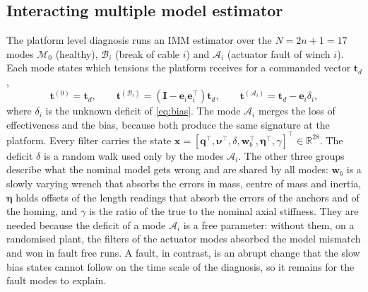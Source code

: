 \documentclass[a4paper,fleqn]{cas-dc}
\newcommand{\vc}[1]{\bm{#1}}
\newcommand{\mt}[1]{\mathbf{#1}}
\newcommand{\eye}{\mt{I}}
\begin{document}
\subsection{Interacting multiple model estimator}\label{sec:imm}

The platform level diagnosis runs an IMM estimator \citep{blom1988imm} over the $N=2n+1=17$ modes $\mathcal M_0$ (healthy), $\mathcal B_i$ (break of cable $i$) and $\mathcal A_i$ (actuator fault of winch $i$). Each mode states which tensions the platform receives for a commanded vector $\vc t_d$,
\begin{equation}\label{eq:modes}
\vc t^{(0)}=\vc t_d,\qquad \vc t^{(\mathcal B_i)}=(\eye-\vc e_i\vc e_i^\top)\vc t_d,\qquad \vc t^{(\mathcal A_i)}=\vc t_d-\vc e_i\delta_i,
\end{equation}
where $\delta_i$ is the unknown deficit of \eqref{eq:bias}. The mode $\mathcal A_i$ merges the loss of effectiveness and the bias, because both produce the same signature at the platform. Every filter carries the state $\vc x=[\vc q^\top,\vc\nu^\top,\delta,\vc w_b^\top,\vc\eta^\top,\gamma]^\top\in\mathbb R^{28}$. The deficit $\delta$ is a random walk used only by the modes $\mathcal A_i$. The other three groups describe what the nominal model gets wrong and are shared by all modes: $\vc w_b$ is a slowly varying wrench that absorbs the errors in mass, centre of mass and inertia, $\vc\eta$ holds offsets of the length readings that absorb the errors of the anchors and of the homing, and $\gamma$ is the ratio of the true to the nominal axial stiffness. They are needed because the deficit of a mode $\mathcal A_i$ is a free parameter: without them, on a randomised plant, the filters of the actuator modes absorbed the model mismatch and won in fault free runs. A fault, in contrast, is an abrupt change that the slow bias states cannot follow on the time scale of the diagnosis, so it remains for the fault modes to explain.
\end{document}
